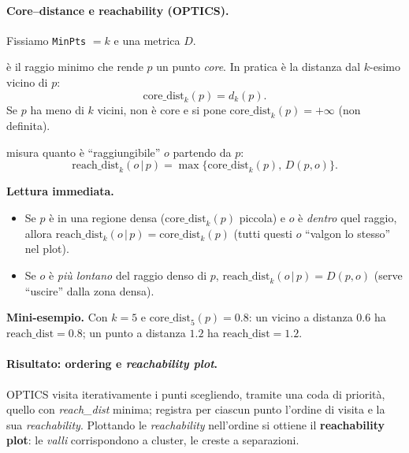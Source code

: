 \paragraph{Core–distance e reachability (OPTICS).}
Fissiamo \texttt{MinPts} $=k$ e una metrica $D$.

\begin{description}[leftmargin=1.2em,labelsep=0.5em]
  \item[\emph{Core–distance} di $p$:] è il raggio minimo che rende $p$ un punto \emph{core}. 
  In pratica è la distanza dal $k$-esimo vicino di $p$:
  \[
  \mathrm{core\_dist}_k(p)=d_k(p).
  \]
  Se $p$ ha meno di $k$ vicini, non è core e si pone $\mathrm{core\_dist}_k(p)=+\infty$ (non definita).
  
  \item[\emph{Reachability–distance} di $o$ da $p$:] misura quanto è “raggiungibile” $o$ partendo da $p$:
  \[
  \mathrm{reach\_dist}_k(o\,|\,p)=\max\{\mathrm{core\_dist}_k(p),\, D(p,o)\}.
  \]
\end{description}

\noindent\textbf{Lettura immediata.}
\begin{itemize}
  \item Se $p$ è in una regione densa (\(\mathrm{core\_dist}_k(p)\) piccola) e $o$ è \emph{dentro} quel raggio, allora
        \(\mathrm{reach\_dist}_k(o\,|\,p)=\mathrm{core\_dist}_k(p)\) (tutti questi $o$ “valgon lo stesso” nel plot).
  \item Se $o$ è \emph{più lontano} del raggio denso di $p$, 
        \(\mathrm{reach\_dist}_k(o\,|\,p)=D(p,o)\) (serve “uscire” dalla zona densa).
\end{itemize}

\noindent\textbf{Mini-esempio.} Con $k=5$ e \(\mathrm{core\_dist}_5(p)=0.8\):
un vicino a distanza \(0.6\) ha \(\mathrm{reach\_dist}=0.8\); un punto a distanza \(1.2\) ha \(\mathrm{reach\_dist}=1.2\).


\paragraph{Risultato: ordering e \emph{reachability plot}.}
OPTICS visita iterativamente i punti scegliendo, tramite una coda di priorità, quello con \emph{reach\_dist} minima; registra per ciascun punto l’ordine di visita e la sua \emph{reachability}. Plottando le \emph{reachability} nell’ordine si ottiene il \textbf{reachability plot}: le \emph{valli} corrispondono a cluster, le creste a separazioni.

